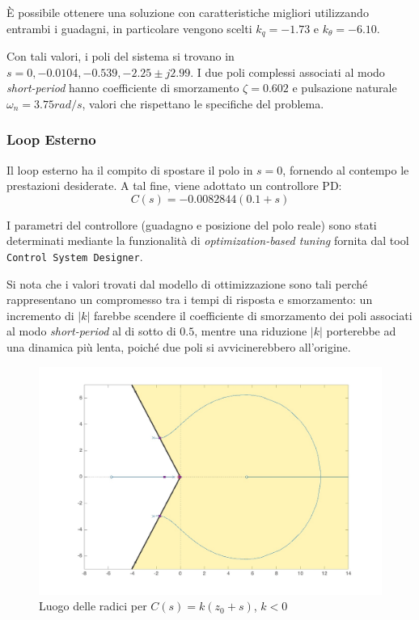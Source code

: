 È possibile ottenere una soluzione con caratteristiche migliori utilizzando entrambi i guadagni, in particolare vengono scelti $k_q = -1.73$ e $k_{\theta} = -6.10$.

Con tali valori, i poli del sistema si trovano in $s = 0, -0.0104, -0.539, -2.25 \pm j2.99$. I due poli complessi associati al modo \textit{short-period} hanno coefficiente di smorzamento $\zeta = 0.602$ e pulsazione naturale $\omega_n = 3.75 rad/s$, valori che rispettano le specifiche del problema.

\subsubsection{Loop Esterno}

Il loop esterno ha il compito di spostare il polo in $s = 0$, fornendo al contempo le prestazioni desiderate. A tal fine, viene adottato un controllore PD:
\begin{equation*}
    C(s) = -0.0082844 (0.1 + s)
\end{equation*}

I parametri del controllore (guadagno e posizione del polo reale) sono stati determinati mediante la funzionalità di \textit{optimization-based tuning} fornita dal tool \texttt{Control System Designer}.

Si nota che i valori trovati dal modello di ottimizzazione sono tali perché rappresentano un compromesso tra i tempi di risposta e smorzamento:
un incremento di $\left|k\right|$ farebbe scendere il coefficiente di smorzamento dei poli associati al modo \textit{short-period} al di sotto di $0.5$,
mentre una riduzione $\left|k\right|$ porterebbe ad una dinamica più lenta, poiché due poli si avvicinerebbero all'origine.

\begin{figure}[H]
    \centering
    \includegraphics[width=0.6\linewidth]{Immagini/root_h.pdf}
    \caption{Luogo delle radici per $C(s) = k(z_0 + s)$, $k < 0$}
\end{figure}

